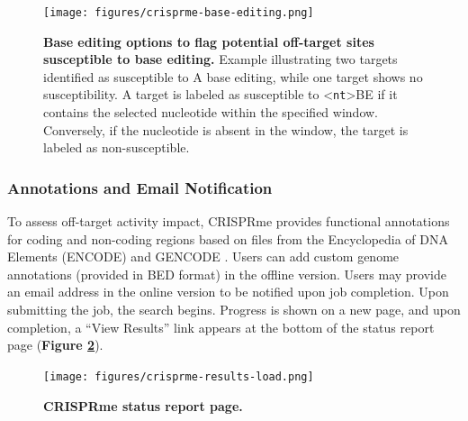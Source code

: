 \documentclass[a4paper, titlepage, openright]{book}
\newcommand{\crisprme}{CRISPRme\xspace}
\begin{document}
\begin{figure}[!]
	\centering
	\texttt{[image: figures/crisprme-base-editing.png]}
	\caption[Base editing options to flag potential off-target sites susceptible to base editing]{\textbf{Base editing options to flag potential off-target sites susceptible to base editing.} Example illustrating two targets identified as susceptible to A base editing, while one target shows no susceptibility. A target is labeled as susceptible to <\texttt{nt}>BE if it contains the selected nucleotide within the specified window. Conversely, if the nucleotide is absent in the window, the target is labeled as non-susceptible.}
	\label{fig:crisprme-base-editing}
\end{figure}

\subsubsection{Annotations and Email Notification}
To assess off-target activity impact, \crisprme provides functional annotations for coding and non-coding regions based on files from the Encyclopedia of DNA Elements (ENCODE) \citep{encode2012integrated} and GENCODE \citep{frankish2019gencode}. Users can add custom genome annotations (provided in BED format) in the offline version. Users may provide an email address in the online version to be notified upon job completion. Upon submitting the job, the search begins. Progress is shown on a new page, and upon completion, a “View Results” link appears at the bottom of the status report page (\textbf{Figure \ref{fig:crisprme-results-load}}).

\begin{figure}[!]
	\centering
	\texttt{[image: figures/crisprme-results-load.png]}
	\caption[\crisprme status report page]{\textbf{\crisprme status report page.}}
	\label{fig:crisprme-results-load}
\end{figure}


\end{document}
